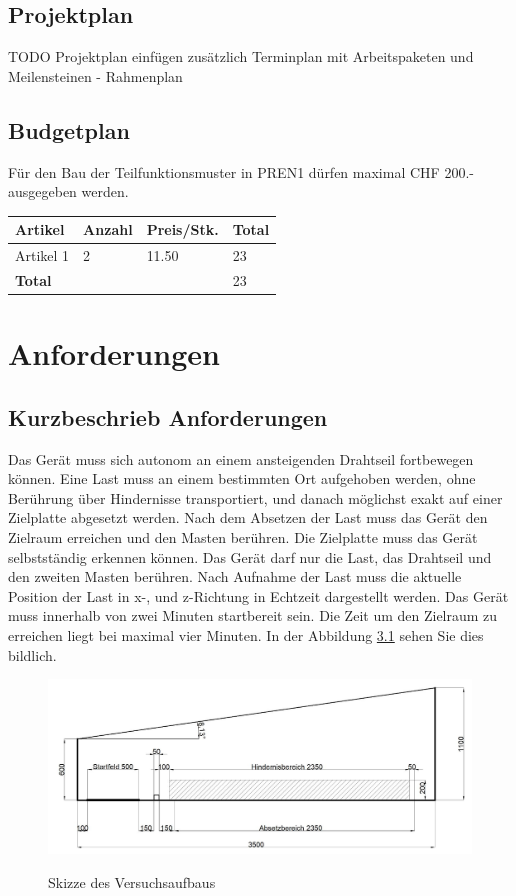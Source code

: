 \documentclass[a4paper]{report}
\begin{document}
\section{Projektplan}
TODO Projektplan einfügen zusätzlich Terminplan mit Arbeitspaketen und Meilensteinen - Rahmenplan

\section{Budgetplan}
Für den Bau der Teilfunktionsmuster in PREN1 dürfen maximal CHF 200.- ausgegeben werden.

\vspace{1em}
\noindent
\begin{tabular}{|p{}|p{}|p{}|p{}|}
	\hline
	\textbf{Artikel} & \textbf{Anzahl} & \textbf{Preis/Stk.} & \textbf{Total} \\
	\hline
	Artikel 1 & 2 & 11.50 & 23 \\
	\hline
	\textbf{Total} & & & 23 \\
	\hline
\end{tabular}


\chapter{Anforderungen}
\section{Kurzbeschrieb Anforderungen}

Das Gerät muss sich autonom an einem ansteigenden Drahtseil fortbewegen können. Eine Last muss an einem bestimmten Ort aufgehoben werden, ohne Berührung über Hindernisse transportiert, und danach möglichst exakt auf einer Zielplatte abgesetzt werden. Nach dem Absetzen der Last muss das Gerät den Zielraum erreichen und den Masten berühren. Die Zielplatte muss das Gerät selbstständig erkennen können. Das Gerät darf nur die Last, das Drahtseil und den zweiten Masten berühren. Nach Aufnahme der Last muss die aktuelle Position der Last in x-, und z-Richtung in Echtzeit dargestellt werden. Das Gerät muss innerhalb von zwei Minuten startbereit sein. Die Zeit um den Zielraum zu erreichen liegt bei maximal vier Minuten. In der Abbildung \ref{fig:Funktionsskizze} sehen Sie dies bildlich.

\begin{figure}[h!]
	\includegraphics[keepaspectratio,width=\textwidth]{PrenFunktionsskizze}
	\label{fig:Funktionsskizze}
	\caption{Skizze des Versuchsaufbaus}
\end{figure}
\end{document}

